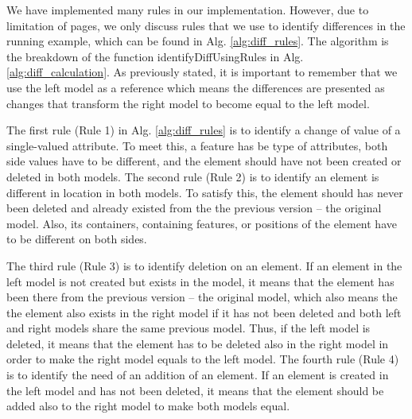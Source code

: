 \documentclass{jot}
\begin{document}
We have implemented many rules in our implementation. However, due to limitation of pages, we only discuss rules that we use to identify differences in the running example, which can be found in Alg. \ref{alg:diff_rules}. The algorithm is the breakdown of the function \textsf{identifyDiffUsingRules} in Alg. \ref{alg:diff_calculation}. As previously stated, it is important to remember that we use the left model as a reference which means the differences are presented as changes that transform the right model to become equal to the left model. 

The first rule (Rule 1) in Alg. \ref{alg:diff_rules} is to identify a change of value of a single-valued attribute. To meet this, a feature has be type of attributes, both side values have to be different, and the element should have not been created or deleted in both models. The second rule (Rule 2) is to identify an element is different in location in both models. To satisfy this, the element should has never been deleted and already existed from the the previous version -- the original model. Also, its containers, containing features, or positions of the element have to be different on both sides.

The third rule (Rule 3)  is to identify deletion on an element. If an element in the left model is not created but exists in the model, it means that the element has been there from the previous version -- the original model, which also means the the element also exists in the right model if it has not been deleted and both left and right models share the same previous model. Thus, if the left model is deleted, it means that the element has to be deleted also in the right model in order to make the right model equals to the left model. The fourth rule (Rule 4) is to identify the need of an addition of an element. If an element is created in the left model and has not been deleted, it means that the element should be added also to the right model to make both models equal.
 
\end{document}
